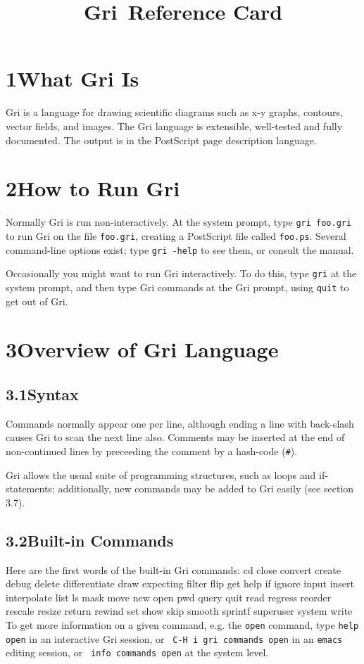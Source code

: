 

\title{Gri \griversion$\,$Reference Card}



\section{1\quad What Gri Is}
Gri is a language for drawing scientific diagrams such as x-y graphs,
contours, vector fields, and images.  The Gri language is extensible,
well-tested and fully documented.  The output is in the PostScript
page description language.

\section{2\quad How to Run Gri}
Normally Gri is run non-interactively.  At the system prompt, type
{\tt gri foo.gri} to run Gri on the file {\tt foo.gri}, creating a
PostScript file called {\tt foo.ps}.  Several command-line options
exist; type {\tt gri -help} to see them, or consult the manual.

Occasionally you might want to run Gri interactively.  To do this,
type {\tt gri} at the system prompt, and then type Gri commands at the
Gri prompt, using {\tt quit} to get out of Gri.


\section{3\quad Overview of Gri Language}
\subsection{3.1\quad Syntax}
Commands normally appear one per line, although ending a line with
back-slash causes Gri to scan the next line also.  Comments may be
inserted at the end of non-continued lines by preceeding the comment
by a hash-code ({\tt \#}).

Gri allows the usual suite of programming structures, such as loops
and if-statements; additionally, new commands may be added to Gri
easily (see section 3.7).

\subsection{3.2\quad Built-in Commands}

Here are the first words of the built-in Gri commands:
\beginexample
cd      close         convert     create    debug
delete  differentiate draw        expecting filter
flip    get           help        if        ignore
input   insert        interpolate list      ls
mask    move          new         open      pwd
query   quit          read        regress   reorder
rescale resize        return      rewind    set
show    skip          smooth      sprintf   superuser
system  write
\endexample
To get more information on a given command, e.g. the {\tt open}
command, type {\tt help open} in an interactive Gri session, or {\tt
C-H i gri commands open} in an {\tt emacs} editing session, or {\tt
info commands open} at the system level.


